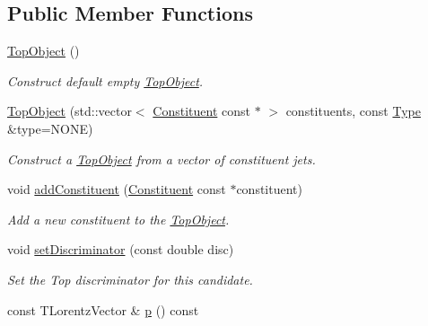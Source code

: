 \subsection*{Public Member Functions}
\begin{DoxyCompactItemize}
\item 
\hypertarget{classTopObject_a0eb6419f5a625d5ad777df5363e02f90}{\hyperlink{classTopObject_a0eb6419f5a625d5ad777df5363e02f90}{Top\-Object} ()}\label{classTopObject_a0eb6419f5a625d5ad777df5363e02f90}

\begin{DoxyCompactList}\small\item\em Construct default empty \hyperlink{classTopObject}{Top\-Object}. \end{DoxyCompactList}\item 
\hypertarget{classTopObject_a7888dbf304a6fb09af55b4a632cab5ef}{\hyperlink{classTopObject_a7888dbf304a6fb09af55b4a632cab5ef}{Top\-Object} (std\-::vector$<$ \hyperlink{classConstituent}{Constituent} const $\ast$ $>$ constituents, const \hyperlink{classTopObject_af82a20e421c29bc667af7cd73fc46ba4}{Type} \&type=N\-O\-N\-E)}\label{classTopObject_a7888dbf304a6fb09af55b4a632cab5ef}

\begin{DoxyCompactList}\small\item\em Construct a \hyperlink{classTopObject}{Top\-Object} from a vector of constituent jets. \end{DoxyCompactList}\item 
\hypertarget{classTopObject_adafc98b5660ac2ca92f9115668de2c10}{void \hyperlink{classTopObject_adafc98b5660ac2ca92f9115668de2c10}{add\-Constituent} (\hyperlink{classConstituent}{Constituent} const $\ast$constituent)}\label{classTopObject_adafc98b5660ac2ca92f9115668de2c10}

\begin{DoxyCompactList}\small\item\em Add a new constituent to the \hyperlink{classTopObject}{Top\-Object}. \end{DoxyCompactList}\item 
\hypertarget{classTopObject_abf5123e8c707e9059c8ec96b35643bef}{void \hyperlink{classTopObject_abf5123e8c707e9059c8ec96b35643bef}{set\-Discriminator} (const double disc)}\label{classTopObject_abf5123e8c707e9059c8ec96b35643bef}

\begin{DoxyCompactList}\small\item\em Set the Top discriminator for this candidate. \end{DoxyCompactList}\item 
\hypertarget{classTopObject_a52fbbf2a336d0e174f509304f8c1c984}{const T\-Lorentz\-Vector \& \hyperlink{classTopObject_a52fbbf2a336d0e174f509304f8c1c984}{p} () const }\label{classTopObject_a52fbbf2a336d0e174f509304f8c1c984}


\end{DoxyCompactItemize}
